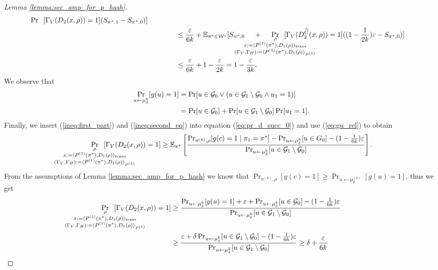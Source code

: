 \begin{proof}[Lemma \ref{lemma:sec_amp_for_p_hash}]
\begin{align}
{\Pr}\mkern13mu[\Gamma_V(D_2(x, \rho)) = 1]
(S_{\pi^*,1} - S_{\pi^*,0}) ] \notag\\
&\IndII \leq \frac{\epsilon}{6k} + \mathbb{E}_{\pi^* \in \cW^c}[ S_{\pi^*,0} \mkern23mu + \mkern23mu
\underset{
  \mathclap{
  \substack{\rho \\ x := \langle P^{(1)}(\pi^*), D_1(\rho) \rangle_{\text{trans}}
    \\ (\Gamma_V, \Gamma_H) := \langle P^{(1)}(\pi^*), D_1 (\rho) \rangle_{P^{(1)}} }}}
{\Pr}\mkern13mu[\Gamma_V(D_2^{\widetilde{C}}(x, \rho)) = 1]
((1 - \frac{1}{2k})\epsilon - S_{\pi^*,0})] \notag\\
&\IndII \leq \frac{\epsilon}{6k} + 1 - \frac{\epsilon}{2k} = 1 - \frac{\epsilon}{3k}.
\end{align}
We observe that
\begin{align}
  \label{eq:gu_rel}
\underset{u \leftarrow \mu_{\delta}^k}{\Pr}[g(u) = 1]
&= \Pr[u \in \mathcal{G}_0 \lor ( u \in \mathcal{G}_1 \setminus \mathcal{G}_0 \land u_1 = 1)] \notag\\
&= \Pr[u \in \mathcal{G}_0] + \Pr[u \in \mathcal{G}_1 \setminus \mathcal{G}_0] \Pr[u_1 = 1].
\end{align}
Finally, we insert (\ref{ineq:first_part}) and (\ref{ineq:second_eq}) into equation (\ref{eq:pr_d_succ_0}) and use (\ref{eq:gu_rel}) to obtain
\begin{align*}
  \IndII
\underset{
  \mathclap{
  \substack{\rho \\ x := \langle P^{(1)}(\pi^*), D_1(\rho) \rangle_{\text{trans}}
    \\ (\Gamma_V, \Gamma_H) := \langle P^{(1)}(\pi^*), D_1 (\rho) \rangle_{P^{(1)}} }}}
{\Pr}\mkern13mu[\Gamma_V(D_2(x, \rho)) = 1]
&\geq \mathbb{E}_{\pi^*}\left[\frac{{\Pr}_{\pi^{(k)}, \rho}[g(c) = 1 \mid \pi_1 = \pi^*] -
{\Pr}_{u \leftarrow \mu_{\delta}^{k}}[u \in G_0] - (1 - \frac{1}{6k})\epsilon} {\Pr_{u \leftarrow \mu_{\delta}^{k}}[u \in \cG_1 \setminus \cG_0]}\right] \notag.
 \end{align*}
 From the assumptions of Lemma \ref{lemma:sec_amp_for_p_hash} we know that $\Pr_{\pi^{(k)}, \rho} [g(c) = 1] \geq \Pr_{u \leftarrow \mu_{\delta}^{(k)}}[g(u) = 1]$,
 thus we get
 \begin{align}
   \label{eq:proof_final}
\underset{
  \mathclap{
  \substack{\rho \\ x := \langle P^{(1)}(\pi^*), D_1(\rho) \rangle_{\text{trans}}
    \\ (\Gamma_V, \Gamma_H) := \langle P^{(1)}(\pi^*), D_1 (\rho) \rangle_{P^{(1)}} }}}
{\Pr}\mkern13mu[\Gamma_V(D_2(x, \rho)) = 1]
 &\geq \frac{ {\Pr}_{u \leftarrow \mu_{\delta}^{k}}[g(u) = 1] + \epsilon +
 \Pr_{u \leftarrow \mu_{\delta}^{k}}[u \in \cG_0] - (1 - \frac{1}{6k})\epsilon} {\Pr_{u \leftarrow \mu_{\delta}^{k}}[u \in \cG_1 \setminus \cG_0]} \notag\\
 &\geq \frac{\epsilon + \delta\Pr_{u \leftarrow \mu_{\delta}^{k}}[u \in \cG_1 \setminus \cG_0] - (1 - \frac{1}{6k})\epsilon}
{\Pr_{u \leftarrow \mu_{\delta}^{k}}[u \in \cG_1 \setminus \cG_0]} \geq \delta + \frac{\epsilon}{6k}
\end{align}
\end{proof}

%
